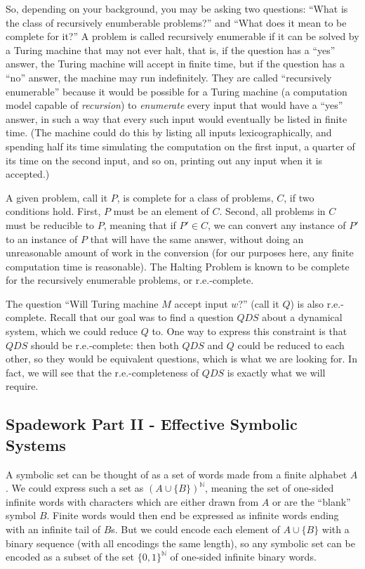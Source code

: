 \documentclass{fkpaper}
\renewcommand{\Nn}{\mathbb{N}}
\begin{document}
\begin{multicols}{2}
  So, depending on your background, you may be asking two questions:
  ``What is the class of recursively enumberable problems?'' and ``What
  does it mean to be complete for it?'' A problem is called recursively
  enumerable if it can be solved by a Turing machine that may not ever
  halt, that is, if the question has a ``yes'' answer, the Turing
  machine will accept in finite time, but if the question has a ``no''
  answer, the machine may run indefinitely. They are called
  ``recursively enumerable'' because it would be possible for a Turing
  machine (a computation model capable of {\it recursion}) to {\it
    enumerate} every input that would have a ``yes'' answer, in such a
  way that every such input would eventually be listed in finite time.
  (The machine could do this by listing all inputs lexicographically,
  and spending half its time simulating the computation on the first
  input, a quarter of its time on the second input, and so on, printing
  out any input when it is accepted.)

  A given problem, call it $P$, is complete for a class of problems,
  $C$, if two conditions hold. First, $P$ must be an element of $C$.
  Second, all problems in $C$ must be reducible to $P$, meaning that if
  $P' \in C$, we can convert any instance of $P'$ to an instance of $P$
  that will have the same answer, without doing an unreasonable amount
  of work in the conversion (for our purposes here, any finite
  computation time is reasonable). The Halting Problem is known to be
  complete for the recursively enumerable problems, or r.e.-complete.

  The question ``Will Turing machine $M$ accept input $w$?'' (call it
  $Q$) is also r.e.-complete. Recall that our goal was to find a
  question $QDS$ about a dynamical system, which we could reduce $Q$ to.
  One way to express this constraint is that $QDS$ should be
  r.e.-complete: then both $QDS$ and $Q$ could be reduced to each other,
  so they would be equivalent questions, which is what we are looking
  for. In fact, we will see that the r.e.-completeness of $QDS$ is
  exactly what we will require.

  \subsection{Spadework Part II - Effective Symbolic Systems}

  A symbolic set can be thought of as a set of words made from a finite
  alphabet $A$. We could express such a set as $(A \cup \{B\})^\Nn$,
  meaning the set of one-sided infinite words with characters which are
  either drawn from $A$ or are the ``blank'' symbol $B$. Finite words
  would then end be expressed as infinite words ending with an infinite
  tail of $B$s. But we could encode each element of $A \cup \{B\}$ with
  a binary sequence (with all encodings the same length), so any
  symbolic set can be encoded as a subset of the set $\{0,1\}^\Nn$ of
  one-sided infinite binary words.


\end{multicols}
\end{document}
